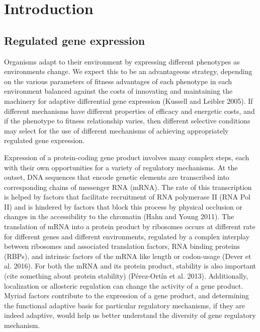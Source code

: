 \chapter{Introduction}

\section{Regulated gene expression} 

Organisms adapt to
their environment by expressing different phenotypes as environments
change. We expect this to be an advantageous strategy, depending on
the various parameters of fitness advantages of each phenotype in each
environment balanced against the costs of innovating and maintaining
the machinery for adaptive differential gene expression (Kussell and
Leibler 2005). If different mechanisms have different properties of
efficacy and energetic costs, and if the phenotype to fitness
relationship varies, then different selective conditions may select
for the use of different mechanisms of achieving appropriately
regulated gene expression.

Expression of a protein-coding gene
product involves many complex steps, each with their own opportunities
for a variety of regulatory mechanisms. At the outset, DNA sequences
that encode genetic elements are transcribed into corresponding chains
of messenger RNA (mRNA). The rate of this transcription is helped by
factors that facilitate recruitment of RNA polymerase II (RNA Pol II)
and is hindered by factors that block this process by physical
occlusion or changes in the accessibility to the chromatin (Hahn and
Young 2011). The translation of mRNA into a protein product by
ribosomes occurs at different rate for different genes and different
environments, regulated by a complex interplay between ribosomes and
associated translation factors, RNA binding proteins (RBPs), and
intrinsic factors of the mRNA like length or codon-usage (Dever et al.
2016). For both the mRNA and its protein product, stability is also
important (cite something about protein stability) (Pérez-Ortín et al.
2013). Additionally, localization or allosteric regulation can change
the activity of a gene product. Myriad factors contribute to the
expression of a gene product, and determining the functional adaptive
basis for particular regulatory mechanisms, if they are indeed
adaptive, would help us better understand the diversity of gene
regulatory mechanism.  

